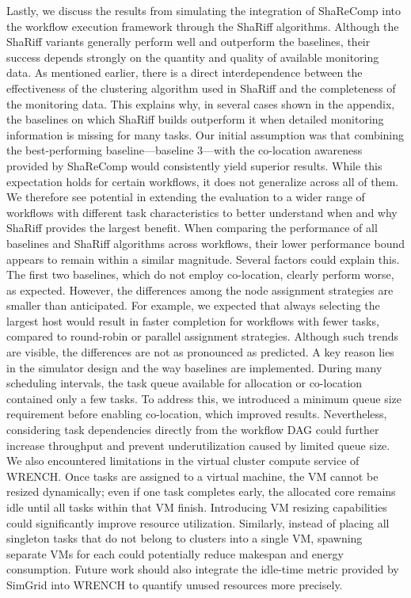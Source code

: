 Lastly, we discuss the results from simulating the integration of ShaReComp into the workflow execution framework through the ShaRiff algorithms. Although the ShaRiff variants generally perform well and outperform the baselines, their success depends strongly on the quantity and quality of available monitoring data. As mentioned earlier, there is a direct interdependence between the effectiveness of the clustering algorithm used in ShaRiff and the completeness of the monitoring data. This explains why, in several cases shown in the appendix, the baselines on which ShaRiff builds outperform it when detailed monitoring information is missing for many tasks.
Our initial assumption was that combining the best-performing baseline—baseline 3—with the co-location awareness provided by ShaReComp would consistently yield superior results. While this expectation holds for certain workflows, it does not generalize across all of them. We therefore see potential in extending the evaluation to a wider range of workflows with different task characteristics to better understand when and why ShaRiff provides the largest benefit.
When comparing the performance of all baselines and ShaRiff algorithms across workflows, their lower performance bound appears to remain within a similar magnitude. Several factors could explain this. The first two baselines, which do not employ co-location, clearly perform worse, as expected. However, the differences among the node assignment strategies are smaller than anticipated. For example, we expected that always selecting the largest host would result in faster completion for workflows with fewer tasks, compared to round-robin or parallel assignment strategies. Although such trends are visible, the differences are not as pronounced as predicted.
A key reason lies in the simulator design and the way baselines are implemented. During many scheduling intervals, the task queue available for allocation or co-location contained only a few tasks. To address this, we introduced a minimum queue size requirement before enabling co-location, which improved results. Nevertheless, considering task dependencies directly from the workflow DAG could further increase throughput and prevent underutilization caused by limited queue size.
We also encountered limitations in the virtual cluster compute service of WRENCH. Once tasks are assigned to a virtual machine, the VM cannot be resized dynamically; even if one task completes early, the allocated core remains idle until all tasks within that VM finish. Introducing VM resizing capabilities could significantly improve resource utilization. Similarly, instead of placing all singleton tasks that do not belong to clusters into a single VM, spawning separate VMs for each could potentially reduce makespan and energy consumption. Future work should also integrate the idle-time metric provided by SimGrid into WRENCH to quantify unused resources more precisely.
